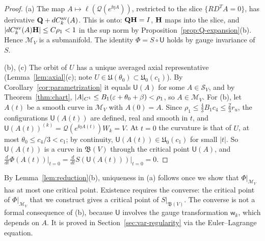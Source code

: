 \begin{proof}
(a) The map $A\mapsto\ell(\mathcal Q(e^{\ii\eta A}))$, restricted to the slice $\{RD^TA=0\}$, has derivative $\mathbf Q+dC^{\rm av}_k(A)$. This is onto: $\mathbf Q\mathbf H=I$, $\mathbf H$ maps into the slice, and $|dC^{\rm av}_k(A)\mathbf H|\le C\rho_1<1$ in the sup norm by Proposition~\ref{prop:Q-expansion}(b). Hence $\mathcal M_V$ is a submanifold. The identity $\Phi=S\circ\mathsf U$ holds by gauge invariance of $S$.

(b), (c) The orbit of $U$ has a unique averaged axial representative (Lemma~\ref{lem:axial}(c); note $U\in\mathfrak U(\theta_0)\subset\mathfrak U_0(c_1)$). By Corollary~\ref{cor:parametrization} it equals $\mathsf U(A)$ for some $A\in\mathcal S_V$, and by Theorem~\ref{thm:chart}, $|A|_{C^1}\le B_1(\varepsilon+\theta_0+\beta)<\rho_1$, so $A\in\mathcal M_V$. For (b), let $A(t)$ be a smooth curve in $\mathcal M_V$ with $A(0)=A$. Since $\rho_1\le\frac43B_1c_4\le\frac23r_u$, the configurations $\mathsf U(A(t))$ are defined, real and smooth in $t$, and $\mathsf U(A(t))^{(k)}=\mathcal Q(e^{\ii\eta A(t)})W_k=V$. At $t=0$ the curvature is that of $U$, at most $\theta_0\le c_4/3<c_1$; by continuity, $\mathsf U(A(t))\in\mathfrak U_0(c_1)$ for small $|t|$. So $\mathsf U(A(t))$ is a curve in $\mathfrak B(V)$ through the critical point $\mathsf U(A)$, and $\frac{d}{dt}\Phi(A(t))\big|_{t=0}=\frac{d}{dt}S(\mathsf U(A(t)))\big|_{t=0}=0$.
\end{proof}

By Lemma~\ref{lem:reduction}(b), uniqueness in (a) follows once we show that $\Phi|_{\mathcal M_V}$ has at most one critical point. Existence requires the converse: the critical point of $\Phi|_{\mathcal M_V}$ that we construct gives a critical point of $S|_{\mathfrak B(V)}$. The converse is not a formal consequence of (b), because $\mathsf U$ involves the gauge transformation $\mathsf w_k$, which depends on $A$. It is proved in Section~\ref{sec:var-regularity} via the Euler--Lagrange equation.
